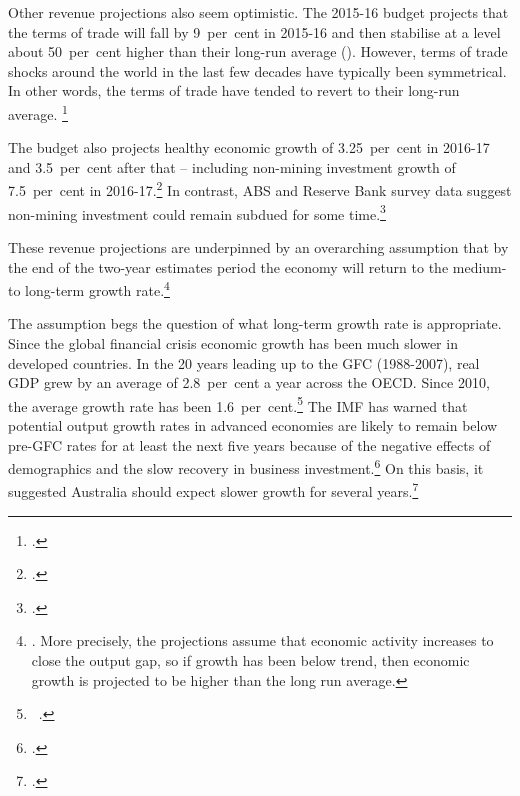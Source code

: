 \documentclass[twoside,english]{palatinob5portrait}
\begin{document}
Other revenue projections also seem optimistic. The 2015-16 budget projects that the terms of trade will fall by 9~per~cent in 2015-16 and then stabilise at a level about 50~per~cent higher than their long-run average (). However, terms of trade shocks around the world in the last few decades have typically been symmetrical. In other words, the terms of trade have tended to revert to their long-run average. \footcite[][34--35]{MinifieCherastidthamMullerworthEtAl2013} 


The budget also projects healthy economic growth of 3.25~per~cent in 2016-17 and 3.5~per~cent after that – including non-mining investment growth of 7.5~per~cent in 2016-17.\footcites[][1--7]{Treasury2015BudgetPapers201516}  In contrast, ABS and Reserve Bank survey data suggest non-mining investment could remain subdued for some time.\footcite[][38--44]{RBA2015a}  

These revenue projections are underpinned by an overarching assumption that by the end of the two-year estimates period the economy will return to the medium- to long-term growth rate.\footnote{\textcite{Treasury2014h}.  More precisely, the projections assume that economic activity increases to close the output gap, so if growth has been below trend, then economic growth is projected to be higher than the long run average.}

The assumption begs the question of what long-term growth rate is appropriate. Since the global financial crisis economic growth has been much slower in developed countries. In the 20 years leading up to the GFC (1988-2007), real GDP grew by an average of 2.8~per~cent a year across the OECD\@. Since 2010, the average growth rate has been 1.6~per~cent.\footnote{\gao\ \textcite{OECD2015a}.}  The IMF has warned that potential output growth rates in advanced economies are likely to remain below pre-GFC rates for at least the next five years because of the negative effects of demographics and the slow recovery in business investment.\footcite[][Chapter~3]{IMF2015b}  On this basis, it suggested Australia should expect slower growth for several years.\footcite{IMF2015} 
\end{document}
